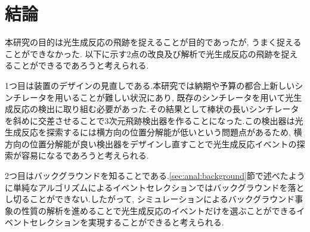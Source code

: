 \chapter{結論}\label{cha:conclusion}
本研究の目的は光生成反応の飛跡を捉えることが目的であったが, うまく捉えることができなかった.
以下に示す2点の改良及び解析で光生成反応の飛跡を捉えることができるであろうと考えられる.

1つ目は装置のデザインの見直しである.本研究では納期や予算の都合上新しいシンチレータを用いることが難しい状況にあり, 既存のシンチレータを用いて光生成反応の検出に取り組む必要があった.その結果として棒状の長いシンチレータを斜めに交差させることで3次元飛跡検出器を作ることになった.この検出器は光生成反応を探索するには横方向の位置分解能が低いという問題点があるため, 横方向の位置分解能が良い検出器をデザインし直すことで光生成反応イベントの探索が容易になるであろうと考えられる.

2つ目はバックグラウンドを知ることである.\ref{sec:anal:background}節で述べたように単純なアルゴリズムによるイベントセレクションではバックグラウンドを落とし切ることができない.したがって, シミュレーションによるバックグラウンド事象の性質の解析を進めることで光生成反応のイベントだけを選ぶことができるイベントセレクションを実現することができると考えられる.